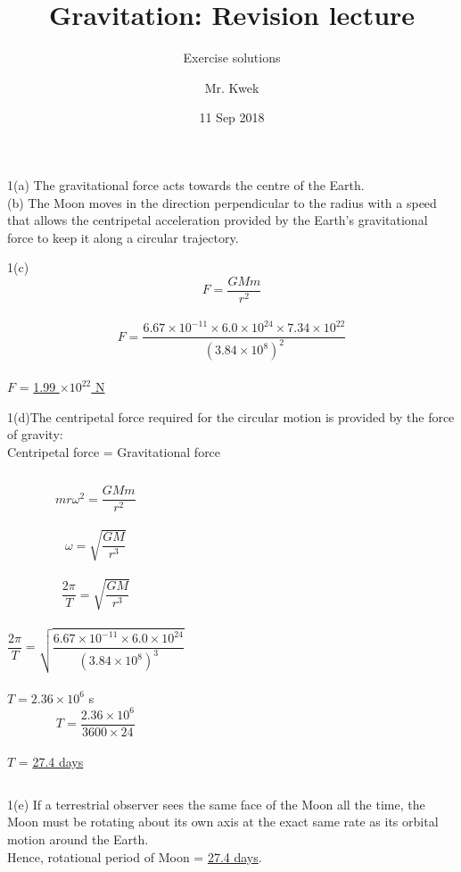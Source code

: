 \documentclass[10pt]{beamer}
\title{Gravitation: Revision lecture}
\subtitle{Exercise solutions}
\author{Mr. Kwek}
\institute
{ Physics Dept.,\\VJC}
\date{11 Sep 2018}
\begin{document}
\frame{\titlepage}


\begin{frame}
1(a) The gravitational force acts towards the centre of the Earth.\\
\vspace{10pt}
(b) The Moon moves in the direction perpendicular to the radius with a speed that allows the centripetal acceleration provided by the Earth's gravitational force to keep it along a circular trajectory.  
\end{frame}

\begin{frame}
1(c)\\ \[F=\frac{GMm}{r^2}\]\\
\[F=\frac{6.67\times 10^{-11}\times 6.0 \times 10^{24} \times 7.34 \times 10^{22}}{(3.84 \times 10^8)^2}\]\\
\vspace{10pt}
$F$ = \underline{1.99 $ \times 10^{22}$ N}\\
\end{frame}

\begin{frame}
1(d)The centripetal force required for the circular motion is provided by the force of gravity:\\
Centripetal force = Gravitational force\\
\begin{columns}
\[mr\omega^2= \frac{GMm}{r^2} \]\\ 
\[\omega= \sqrt{ \frac{GM}{r^3}} \]\\ 
\[ \frac{2\pi}{T}= \sqrt{ \frac{GM}{r^3}} \]\\ 
\[ \frac{2\pi}{T}= \sqrt{ \frac{6.67\times 10^{-11}\times 6.0 \times 10^{24}}{(3.84 \times 10^8)^3}} \]\\ 
$T = 2.36 \times 10^6 $ s\\ 
\[ T = \frac{2.36 \times 10^6}{3600 \times 24} \]  \\
\vspace{10pt}
$T$ = \underline{27.4 days}\\
\end{columns}
\end{frame}

\begin{frame}
\item 1(e) If a terrestrial observer sees the same face of the Moon all the time, the Moon must be rotating about its own axis at the exact same rate as its orbital motion around the Earth.\\ Hence, rotational period of Moon = \underline{27.4 days}. 
\end{frame}
\end{document}
